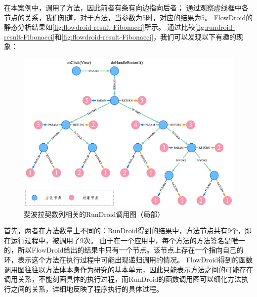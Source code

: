 在本案例中，调用了方法，因此前者有条有向边指向后者；
通过观察虚线框中各节点的关系，我们知道，对于方法，当参数为5时，对应的结果为5。
FlowDroid的静态分析结果如\autoref{fig:flowdroid-result-Fibonacci}所示。
通过比较\autoref{fig:rundroid-result-Fibonacci}和\autoref{fig:flowdroid-result-Fibonacci}，我们可以发现以下有趣的现象：


\begin{figure}[!ht]
	\centering
	\includegraphics[width=\textwidth]{./Figures/doFibonacci-rundroid.png}
	\caption{斐波拉契数列相关的RunDroid调用图（局部）}
	\label{fig:rundroid-result-Fibonacci}
\end{figure}

首先，两者在方法数量上不同的：RunDroid得到的结果中，方法节点共有9个，即在运行过程中，被调用了9次。
由于在一个应用中，每个方法的方法签名是唯一的，所以FlowDroid给出的结果中只有一个节点。该节点上存在一个指向自己的环，表示这个方法在执行过程中可能出现递归调用的情况。
FlowDroid得到的函数调用图往往以方法体本身作为研究的基本单元，因此只能表示方法之间的可能存在调用关系，不能刻画具体的执行过程，而RunDroid的函数调用图可以细化方法执行之间的关系，详细地反映了程序执行的具体过程。




